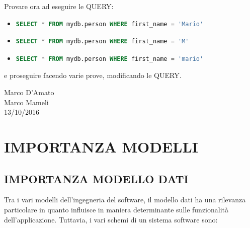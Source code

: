 Provare ora ad eseguire le QUERY:

\begin{itemize}

\item{}

\begin{lstlisting}[language=SQL]
SELECT * FROM mydb.person WHERE first_name = 'Mario'
\end{lstlisting}

\item{}

\begin{lstlisting}[language=SQL]
SELECT * FROM mydb.person WHERE first_name = 'M'
\end{lstlisting}

\item{}

\begin{lstlisting}[language=SQL]
SELECT * FROM mydb.person WHERE first_name = 'mario'
\end{lstlisting}

\end{itemize}

e proseguire facendo varie prove, modificando le QUERY. 

\begin{flushright}Marco D'Amato\\Marco Mameli\\13/10/2016\end{flushright}


\section{IMPORTANZA MODELLI}

\subsection{IMPORTANZA MODELLO DATI}

Tra i vari modelli dell’ingegneria del software, il modello dati ha una rilevanza particolare in quanto influisce in maniera determinante sulle funzionalità dell’applicazione. Tuttavia, i vari schemi di un sistema software sono:

